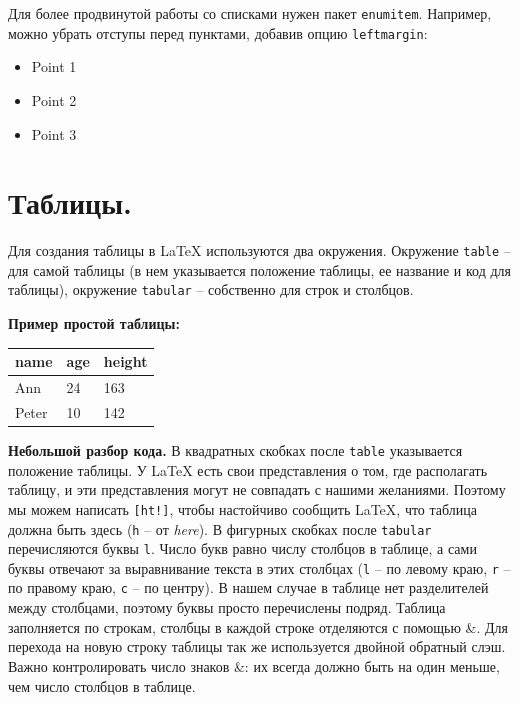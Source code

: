 \documentclass[12pt]{article}
\begin{document}
Для более продвинутой работы со списками нужен пакет \texttt{enumitem}. Например, можно убрать отступы перед пунктами, добавив опцию \texttt{leftmargin}:
\begin{LTXexample}
\begin{itemize}[leftmargin = *]
\item Point 1
\item Point 2
\item Point 3
\end{itemize}
\end{LTXexample}

\section{Таблицы.}

Для создания таблицы в \LaTeX{} используются два окружения. Окружение \texttt{table} -- для самой таблицы (в нем указывается положение таблицы, ее название и код для таблицы), окружение \texttt{tabular} -- собственно для строк и столбцов.  \medskip


\textbf{Пример простой таблицы:}

\begin{LTXexample}
\begin{table}[ht!] 
\begin{tabular}{lll} 
name & age & height \\
\hline
Ann & 24 & 163 \\
Peter & 10 & 142 \\
\hline
\end{tabular}
\end{table}
\end{LTXexample}

\textbf{Небольшой разбор кода.} В квадратных скобках после \texttt{table} указывается положение таблицы. У \LaTeX{} есть свои представления о том, где располагать таблицу, и эти представления могут не совпадать с нашими желаниями. Поэтому мы можем написать \texttt{[ht!]}, чтобы настойчиво сообщить \LaTeX{}, что таблица должна быть здесь (\texttt{h} -- от \textit{here}). В фигурных скобках после \texttt{tabular} перечисляются буквы \texttt{l}. Число букв равно числу столбцов в таблице, а сами буквы отвечают за выравнивание текста в этих столбцах (\texttt{l} -- по левому краю, \texttt{r} -- по правому краю, \texttt{c} -- по центру). В нашем случае в таблице нет разделителей между столбцами, поэтому буквы просто перечислены подряд. Таблица заполняется по строкам, столбцы в каждой строке отделяются с помощью \&. Для перехода на новую строку таблицы так же используется двойной обратный слэш.  Важно контролировать число знаков \&: их всегда должно быть на один меньше, чем число столбцов в таблице.
\end{document}
